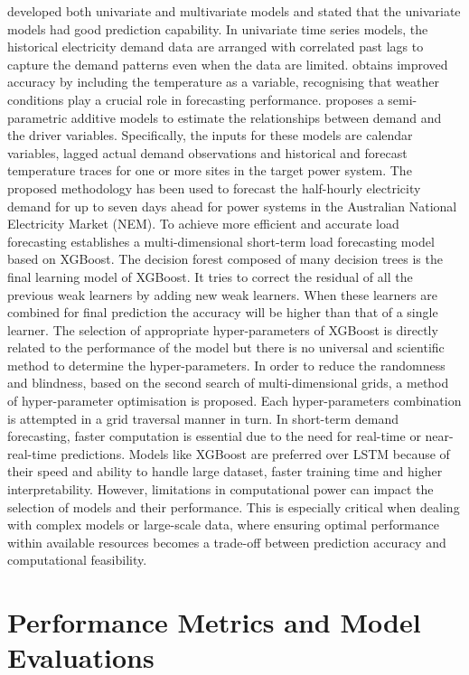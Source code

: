 \documentclass[mstat,12pt]{unswthesis}
\begin{document}
\cite{taylor2009forecasting} developed both univariate and multivariate
models and stated that the univariate models had good prediction
capability. In univariate time series models, the historical electricity
demand data are arranged with correlated past lags to capture the demand
patterns even when the data are limited. \cite{mcculloch2001forecasting}
obtains improved accuracy by including the temperature as a variable,
recognising that weather conditions play a crucial role in forecasting
performance. \cite{Fan2012} proposes a semi-parametric additive models
to estimate the relationships between demand and the driver variables.
Specifically, the inputs for these models are calendar variables, lagged
actual demand observations and historical and forecast temperature
traces for one or more sites in the target power system. The proposed
methodology has been used to forecast the half-hourly electricity demand
for up to seven days ahead for power systems in the Australian National
Electricity Market (NEM). To achieve more efficient and accurate load
forecasting \cite{Suo} establishes a multi-dimensional short-term load
forecasting model based on XGBoost. The decision forest composed of many
decision trees is the final learning model of XGBoost. It tries to
correct the residual of all the previous weak learners by adding new
weak learners. When these learners are combined for final prediction the
accuracy will be higher than that of a single learner. The selection of
appropriate hyper-parameters of XGBoost is directly related to the
performance of the model but there is no universal and scientific method
to determine the hyper-parameters. In order to reduce the randomness and
blindness, based on the second search of multi-dimensional grids, a
method of hyper-parameter optimisation is proposed. Each
hyper-parameters combination is attempted in a grid traversal manner in
turn. In short-term demand forecasting, faster computation is essential
due to the need for real-time or near-real-time predictions. Models like
XGBoost are preferred over LSTM because of their speed and ability to
handle large dataset, faster training time and higher interpretability.
However, limitations in computational power can impact the selection of
models and their performance. This is especially critical when dealing
with complex models or large-scale data, where ensuring optimal
performance within available resources becomes a trade-off between
prediction accuracy and computational feasibility.

\section{Performance Metrics and Model
Evaluations}\label{performance-metrics-and-model-evaluations}
\end{document}
